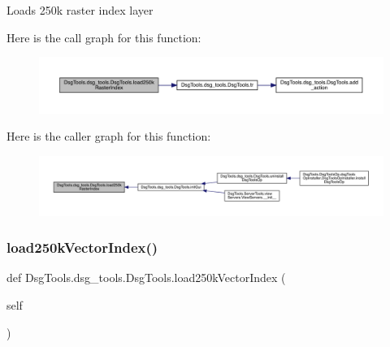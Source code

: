 \begin{DoxyVerb}Loads 250k raster index layer
\end{DoxyVerb}
 Here is the call graph for this function\+:
\nopagebreak
\begin{figure}[H]
\begin{center}
\leavevmode
\includegraphics[width=350pt]{class_dsg_tools_1_1dsg__tools_1_1_dsg_tools_a1246a93b168ad0d4feb6a6dd4cbdb367_cgraph}
\end{center}
\end{figure}
Here is the caller graph for this function\+:
\nopagebreak
\begin{figure}[H]
\begin{center}
\leavevmode
\includegraphics[width=350pt]{class_dsg_tools_1_1dsg__tools_1_1_dsg_tools_a1246a93b168ad0d4feb6a6dd4cbdb367_icgraph}
\end{center}
\end{figure}
\mbox{\label{class_dsg_tools_1_1dsg__tools_1_1_dsg_tools_aba2df30d7b3b395706db4c7efe588e11}} 
\subsubsection{\texorpdfstring{load250k\+Vector\+Index()}{load250kVectorIndex()}}
{\footnotesize\ttfamily def Dsg\+Tools.\+dsg\+\_\+tools.\+Dsg\+Tools.\+load250k\+Vector\+Index (\begin{DoxyParamCaption}\item[{}]{self }\end{DoxyParamCaption})}

